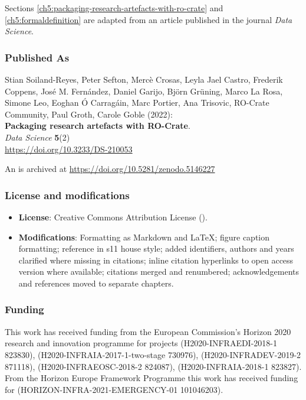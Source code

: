 Sections \vref{ch5:packaging-research-artefacts-with-ro-crate} and \vref{ch5:formaldefinition} are adapted from an article published in the journal \emph{Data Science}.

\subsubsection*{Published As}

Stian Soiland-Reyes, Peter Sefton, Mercè Crosas, Leyla Jael Castro,
Frederik Coppens, José M. Fernández, Daniel Garijo, Björn Grüning, Marco
La Rosa, Simone Leo, Eoghan Ó Carragáin, Marc Portier, Ana Trisovic,
RO-Crate Community, Paul Groth, Carole Goble (2022):\\
\textbf{Packaging research artefacts with RO-Crate}.\\
\emph{Data Science} \textbf{5}(2)\\
\url{https://doi.org/10.3233/DS-210053}

An  is archived at
\url{https://doi.org/10.5281/zenodo.5146227}

\subsubsection*{License and modifications}

\begin{itemize}
\tightlist
\item
  \textbf{License}: Creative Commons Attribution License
  ().
\item
  \textbf{Modifications}: Formatting as Markdown and LaTeX; figure caption
  formatting; reference in s11 house style; added identifiers, authors
  and years clarified where missing in citations; inline citation
  hyperlinks to open access version where available; citations merged and renumbered; 
  acknowledgements and references moved to separate chapters.
\end{itemize}


\subsubsection*{Funding}

This work has received funding from the European Commission's Horizon
2020 research and innovation programme for projects
(H2020-INFRAEDI-2018-1 823830),
(H2020-INFRAIA-2017-1-two-stage 730976),
(H2020-INFRADEV-2019-2 871118),
(H2020-INFRAEOSC-2018-2 824087),
(H2020-INFRAIA-2018-1 823827). From the Horizon Europe Framework
Programme this work has received funding for
(HORIZON-INFRA-2021-EMERGENCY-01 101046203).

